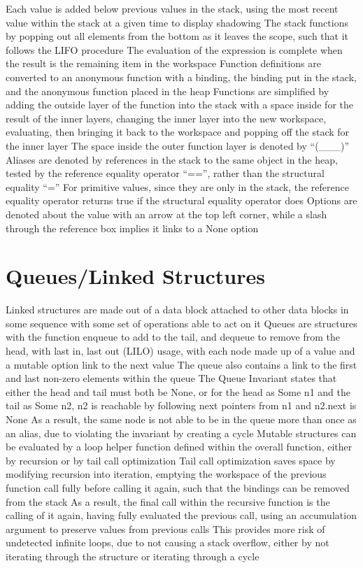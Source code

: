 \documentclass[11 pt, twoside]{article}
\newenvironment{outline*}
{
	\begin{outline}[enumerate]
	}
	{\end{outline}
}
\begin{document}
\begin{outline*}
		\3 Each value is added below previous values in the stack, using the most recent value within the stack at a given time to display shadowing
		\3 The stack functions by popping out all elements from the bottom as it leaves the scope, such that it follows the LIFO procedure
		\3 The evaluation of the expression is complete when the result is the remaining item in the workspace
		\3 Function definitions are converted to an anonymous function with a binding, the binding put in the stack, and the anonymous function placed in the heap
	\2 Functions are simplified by adding the outside layer of the function into the stack with a space inside for the result of the inner layers, changing the inner layer into the new workspace, evaluating, then bringing it back to the workspace and popping off the stack for the inner layer
		\3 The space inside the outer function layer is denoted by ``(\_\_\_)''
	\2 Aliases are denoted by references in the stack to the same object in the heap, tested by the reference equality operator ``=='', rather than the structural equality ``=''
		\3 For primitive values, since they are only in the stack, the reference equality operator returns true if the structural equality operator does
\1 Options are denoted about the value with an arrow at the top left corner, while a slash through the reference box implies it links to a None option
\end{outline*}
\section{Queues/Linked Structures}
\begin{outline*}
\1 Linked structures are made out of a data block attached to other data blocks in some sequence with some set of operations able to act on it
	\2 Queues are structures with the function enqueue to add to the tail, and dequeue to remove from the head, with last in, last out (LILO) usage, with each node made up of a value and a mutable option link to the next value
	\2 The queue also contains a link to the first and last non-zero elements within the queue
\1 The Queue Invariant states that either the head and tail must both be None, or for the head as Some n1 and the tail as Some n2, n2 is reachable by following next pointers from n1 and n2.next is None
	\2 As a result, the same node is not able to be in the queue more than once as an alias, due to violating the invariant by creating a cycle
\1 Mutable structures can be evaluated by a loop helper function defined within the overall function, either by recursion or by tail call optimization
	\2 Tail call optimization saves space by modifying recursion into iteration, emptying the workspace of the previous function call fully before calling it again, such that the bindings can be removed from the stack
		\3 As a result, the final call within the recursive function is the calling of it again, having fully evaluated the previous call, using an accumulation argument to preserve values from previous calls
	\2 This provides more risk of undetected infinite loops, due to not causing a stack overflow, either by not iterating through the structure or iterating through a cycle
\end{outline*}
\end{document}
